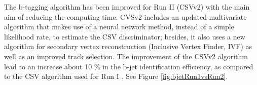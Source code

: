 \begin{table}[ht]%
\end{table}



The b-tagging algorithm has been improved for Run II (CSVv2) with the main aim of reducing
the computing time. CVSv2 includes an updated multivariate algorithm that makes use of a 
neural network method, instead of a simple likelihood rate, to estimate the CSV discriminator; 
besides, it also uses a new algorithm for secondary vertex reconstruction (Inclusive Vertex Finder, IVF) as well as   
an improved track selection. The improvement of the CSVv2 algorithm lead to an increase about 10 $\%$ in 
the b-jet identification efficiency, as compared to the CSV algorithm used for Run I \cite{1742-6596-664-8-082055}. 
See Figure \ref{fig:bjetRun1vsRun2}.

